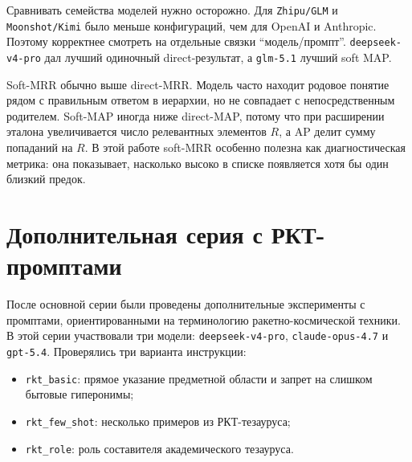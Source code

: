 \documentclass[12pt,a4paper,oneside,openany]{report}
\begin{document}
Сравнивать семейства моделей нужно осторожно. Для \texttt{Zhipu/GLM} и \texttt{Moonshot/Kimi} было меньше конфигураций, чем для OpenAI и Anthropic. Поэтому корректнее смотреть на отдельные связки ``модель/промпт''. \texttt{deepseek-v4-pro} дал лучший одиночный direct-результат, а \texttt{glm-5.1} лучший soft MAP.

Soft-MRR обычно выше direct-MRR. Модель часто находит родовое понятие рядом с правильным ответом в иерархии, но не совпадает с непосредственным родителем. Soft-MAP иногда ниже direct-MAP, потому что при расширении эталона увеличивается число релевантных элементов $R$, а AP делит сумму попаданий на $R$. В этой работе soft-MRR особенно полезна как диагностическая метрика: она показывает, насколько высоко в списке появляется хотя бы один близкий предок.

\section{Дополнительная серия с РКТ-промптами}

После основной серии были проведены дополнительные эксперименты с промптами, ориентированными на терминологию ракетно-космической техники. В этой серии участвовали три модели: \texttt{deepseek-v4-pro}, \texttt{claude-opus-4.7} и \texttt{gpt-5.4}. Проверялись три варианта инструкции:
\begin{itemize}
  \item \texttt{rkt\_basic}: прямое указание предметной области и запрет на слишком бытовые гиперонимы;
  \item \texttt{rkt\_few\_shot}: несколько примеров из РКТ-тезауруса;
  \item \texttt{rkt\_role}: роль составителя академического тезауруса.
\end{itemize}
\end{document}
